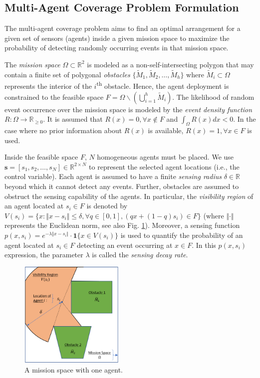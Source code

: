 \documentclass[conference]{IEEEtran}
\newcommand{\R}{\mathbb{R}}
\begin{document}
\subsection{Multi-Agent Coverage Problem Formulation}

The multi-agent coverage problem aims to find an optimal arrangement for a given set of sensors (agents) inside a given mission space to maximize the probability of detecting randomly occurring events in that mission space. 

The \emph{mission space} $\Omega\subset \R^2$ is modeled as a non-self-intersecting polygon \cite{Zhong2011} that may contain a finite set of polygonal \emph{obstacles} $\{\tilde{M}_1,\tilde{M}_2,\ldots,\tilde{M}_h\}$ where $\tilde{M}_i\subset \Omega$ represents the interior of the $i$\textsuperscript{th} obstacle. Hence, the agent deployment is constrained to the feasible space $F=\Omega \backslash (\bigcup_{i=1}^h \tilde{M}_i)$. The likelihood of random event occurrence over the mission space is modeled by the \emph{event density function} $R:\Omega\rightarrow \R_{\geq0}$. It is assumed that $R(x)=0, \forall x\not\in F$ and $\int_{\Omega}R(x)dx<0$. In the case where no prior information about $R(x)$ is available, $R(x)=1, \forall x \in F$ is used. 

Inside the feasible space $F$, $N$ homogeneous agents must be placed. We use $\mathbf{s} = [s_1,s_2,\ldots,s_N] \in \R^{2\times N}$ to represent the selected agent locations (i.e., the control variable). Each agent is assumed to have a finite \emph{sensing radius} $\delta \in \R$ beyond which it cannot detect any events. Further, obstacles are assumed to obstruct the sensing capability of the agents. In particular, the \emph{visibility region} of an agent located at $s_i\in F$ is denoted by $V(s_i) = \{x:\Vert x - s_i\Vert \leq \delta, \forall q \in [0,1], (q x + (1-q)s_i)\in F \}$ (where $\Vert \cdot \Vert$ represents the Euclidean norm, see also Fig. \ref{Fig:Geometry}). Moreover, a sensing function $p(x,s_i)= e^{-\lambda\Vert x-s_i \Vert}\cdot \textbf{1}\{x\in V(s_i)\}$ is used to quantify the probability of an agent located at $s_i \in F$ detecting an event occurring at $x\in F$. In this $p(x,s_i)$ expression, the parameter $\lambda$ is called the \emph{sensing decay rate}. 

\begin{figure}[!h]
    \centering
    \includegraphics[width=2in]{Figures/Geometry.png}
    \caption{A mission space with one agent.}
    \label{Fig:Geometry}
\end{figure}
\end{document}
